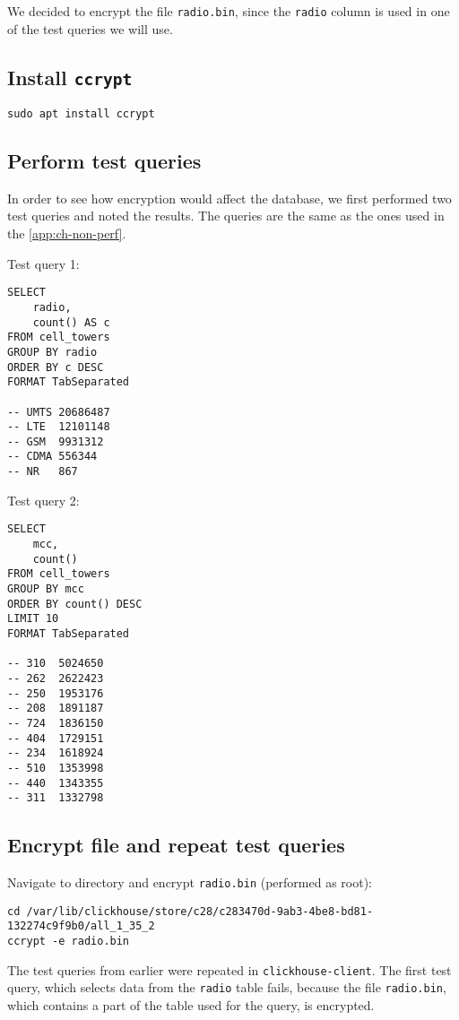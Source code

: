 We decided to encrypt the file \texttt{radio.bin},
since the \texttt{radio} column is used in one of the test queries we will use.

\subsection{Install \texttt{ccrypt}}
\label{sec:orga964650}
\begin{verbatim}
sudo apt install ccrypt
\end{verbatim}
\subsection{Perform test queries}
\label{sec:org0e389d8}
In order to see how encryption would affect the database,
we first performed two test queries and noted the results.
The queries are the same as the ones used in the \ref{app:ch-non-perf}.

Test query 1:
\begin{verbatim}
SELECT
    radio,
    count() AS c
FROM cell_towers
GROUP BY radio
ORDER BY c DESC
FORMAT TabSeparated

-- UMTS 20686487
-- LTE  12101148
-- GSM  9931312
-- CDMA 556344
-- NR   867
\end{verbatim}

Test query 2:
\begin{verbatim}
SELECT
    mcc,
    count()
FROM cell_towers
GROUP BY mcc
ORDER BY count() DESC
LIMIT 10
FORMAT TabSeparated

-- 310  5024650
-- 262  2622423
-- 250  1953176
-- 208  1891187
-- 724  1836150
-- 404  1729151
-- 234  1618924
-- 510  1353998
-- 440  1343355
-- 311  1332798
\end{verbatim}
\subsection{Encrypt file and repeat test queries}
\label{sec:orgec4825e}
Navigate to directory and encrypt \texttt{radio.bin} (performed as root):
\begin{verbatim}
cd /var/lib/clickhouse/store/c28/c283470d-9ab3-4be8-bd81-132274c9f9b0/all_1_35_2
ccrypt -e radio.bin
\end{verbatim}

The test queries from earlier were repeated in \texttt{clickhouse-client}.
The first test query, which selects data from the \texttt{radio} table fails,
because the file \texttt{radio.bin}, which contains a part of the table used
for the query, is encrypted.

